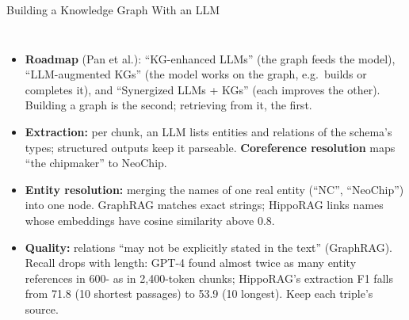\begin{frame}{Building a Knowledge Graph With an LLM}
  \begin{columns}[T,onlytextwidth]
      \begin{itemize}\footnotesize\itemsep0.3em
        \item[\textcolor{red}{$\blacktriangleright$}] \textbf{Roadmap} (Pan et al.): ``KG-enhanced LLMs'' (the graph feeds the model), ``LLM-augmented KGs'' (the model works on the graph, e.g.\ builds or completes it), and ``Synergized LLMs + KGs'' (each improves the other). Building a graph is the second; retrieving from it, the first.
        \item[\textcolor{red}{$\blacktriangleright$}] \textbf{Extraction:} per chunk, an LLM lists entities and relations of the schema's types; structured outputs keep it parseable. \textbf{Coreference resolution} maps ``the chipmaker'' to NeoChip.
        \item[\textcolor{red}{$\blacktriangleright$}] \textbf{Entity resolution:} merging the names of one real entity (``NC'', ``NeoChip'') into one node. GraphRAG matches exact strings; HippoRAG links names whose embeddings have cosine similarity above 0.8.
        \item[\textcolor{red}{$\blacktriangleright$}] \textbf{Quality:} relations ``may not be explicitly stated in the text'' (GraphRAG). Recall drops with length: GPT-4 found almost twice as many entity references in 600- as in 2{,}400-token chunks; HippoRAG's extraction F1 falls from 71.8 (10 shortest passages) to 53.9 (10 longest). Keep each triple's source.
      \end{itemize}
      \centering
\end{columns}
\end{frame}
